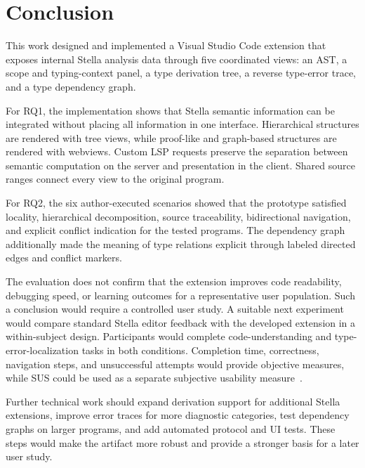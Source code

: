 ﻿\chapter{Conclusion}
\label{chap:conclusion}

This work designed and implemented a Visual Studio Code extension that exposes internal Stella analysis data through five coordinated views: an AST, a scope and typing-context panel, a type derivation tree, a reverse type-error trace, and a type dependency graph.

For RQ1, the implementation shows that Stella semantic information can be integrated without placing all information in one interface. Hierarchical structures are rendered with tree views, while proof-like and graph-based structures are rendered with webviews. Custom LSP requests preserve the separation between semantic computation on the server and presentation in the client. Shared source ranges connect every view to the original program.

For RQ2, the six author-executed scenarios showed that the prototype satisfied locality, hierarchical decomposition, source traceability, bidirectional navigation, and explicit conflict indication for the tested programs. The dependency graph additionally made the meaning of type relations explicit through labeled directed edges and conflict markers.

The evaluation does not confirm that the extension improves code readability, debugging speed, or learning outcomes for a representative user population. Such a conclusion would require a controlled user study. A suitable next experiment would compare standard Stella editor feedback with the developed extension in a within-subject design. Participants would complete code-understanding and type-error-localization tasks in both conditions. Completion time, correctness, navigation steps, and unsuccessful attempts would provide objective measures, while SUS could be used as a separate subjective usability measure~\cite{Brooke1996SUS,Bangor2009SUS,ISO924111}.

Further technical work should expand derivation support for additional Stella extensions, improve error traces for more diagnostic categories, test dependency graphs on larger programs, and add automated protocol and UI tests. These steps would make the artifact more robust and provide a stronger basis for a later user study.

